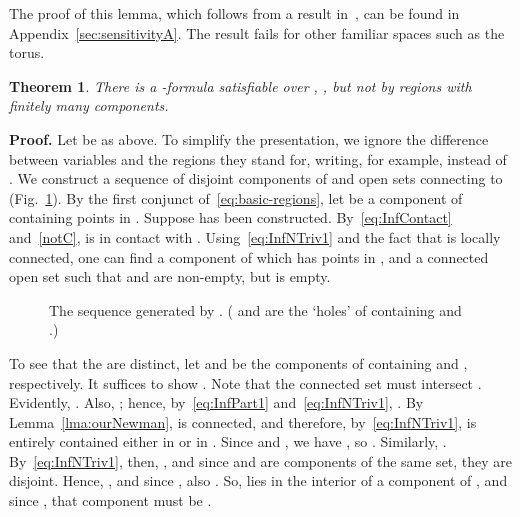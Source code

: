 \documentclass{article}
\newtheorem{theorem}{Theorem}
\newcommand{\qedsymbol}{\ding{113}}
\newenvironment{proof}{\par\noindent\textbf{Proof.}}{\mbox{}\hfill\qedsymbol\par\bigskip}
\begin{document}
The proof of this lemma, which follows from a result
in~\cite{ijcai:Newman64}, can be found in Appendix~\ref{sec:sensitivityA}. 
The result fails for other familiar spaces such as the torus.
\begin{theorem}\label{theo:inftyCc}
There is a -formula 
satisfiable over , , but not by regions with finitely many components.
\end{theorem}
\begin{proof}
Let  be as above.
To simplify the presentation, we ignore the difference between variables
and the regions they stand for, writing, for example,  instead of
.  We construct a sequence of disjoint components
 of  and open sets  connecting  to
 (Fig.~\ref{fig:InfCmpConstr}). By the first conjunct
of~\eqref{eq:basic-regions}, let  be a component of 
containing points in . Suppose  has been constructed.
By~\eqref{eq:InfContact} and~\eqref{notC},  is in contact with
. Using~\eqref{eq:InfNTriv1} and the fact that
 is locally connected, one can find a
component  of  which has points in ,
and a connected open set  such that  and  are non-empty, but  is empty.
\begin{figure}[h]
\begin{center}
\end{center}
\vspace*{-2mm}
\caption{The sequence  generated by .
( and  are the `holes' of  containing  and .)
}
\label{fig:InfCmpConstr}
\end{figure}


To see that the  are distinct, let  and  be the
components of  containing  and ,
respectively. It suffices to show .
Note that the connected set  must intersect .
Evidently, .
Also, ; hence,
by~\eqref{eq:InfPart1} and~\eqref{eq:InfNTriv1}, .  By Lemma~\ref{lma:ourNewman},
 is connected, and therefore, by~\eqref{eq:InfNTriv1},
is entirely contained either in  or in
. Since  and
, we have , so . Similarly,
.  By~\eqref{eq:InfNTriv1}, then,
, and since 
and  are components of the same set, they are
disjoint. Hence, , and since
, also . So,  lies in the interior of
a component of , and since , that component must be .
\end{proof}
\end{document}

